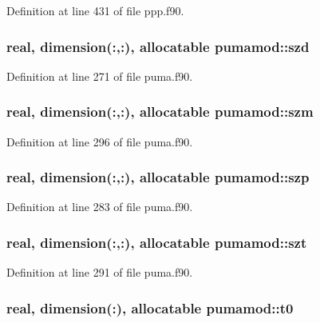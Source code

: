 \-Definition at line 431 of file ppp.\-f90.

\hypertarget{classpumamod_a2de620590b09238085f6a8c4810c4392}{
\subsubsection[{szd}]{\setlength{\rightskip}{0pt plus 5cm}real, dimension(\-:,\-:), allocatable {\bf pumamod\-::szd}}}
\label{classpumamod_a2de620590b09238085f6a8c4810c4392}


\-Definition at line 271 of file puma.\-f90.

\hypertarget{classpumamod_a7961c979cb0a5cb3cfb7cce5a9d16d6b}{
\subsubsection[{szm}]{\setlength{\rightskip}{0pt plus 5cm}real, dimension(\-:,\-:), allocatable {\bf pumamod\-::szm}}}
\label{classpumamod_a7961c979cb0a5cb3cfb7cce5a9d16d6b}


\-Definition at line 296 of file puma.\-f90.

\hypertarget{classpumamod_a1d691f7ffd430d06377c953ac7b1615a}{
\subsubsection[{szp}]{\setlength{\rightskip}{0pt plus 5cm}real, dimension(\-:,\-:), allocatable {\bf pumamod\-::szp}}}
\label{classpumamod_a1d691f7ffd430d06377c953ac7b1615a}


\-Definition at line 283 of file puma.\-f90.

\hypertarget{classpumamod_a9414c9820ee505006ea2ef90a1e4786c}{
\subsubsection[{szt}]{\setlength{\rightskip}{0pt plus 5cm}real, dimension(\-:,\-:), allocatable {\bf pumamod\-::szt}}}
\label{classpumamod_a9414c9820ee505006ea2ef90a1e4786c}


\-Definition at line 291 of file puma.\-f90.

\hypertarget{classpumamod_aa0e5d4127d9cbc662e69de401ab0878f}{
\subsubsection[{t0}]{\setlength{\rightskip}{0pt plus 5cm}real, dimension(\-:), allocatable {\bf pumamod\-::t0}}}
\label{classpumamod_aa0e5d4127d9cbc662e69de401ab0878f}


